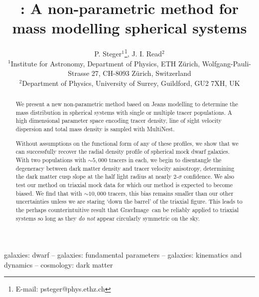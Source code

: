 \documentclass[useAMS,usenatbib,letter]{mn2e}
\title[\GravImage: Non-parametric spherical mass modelling]{\GravImage: A
  non-parametric method for mass modelling spherical systems}
\author[Steger]{P. Steger$^1$\thanks{E-mail: psteger@phys.ethz.ch}, J. I. Read$^{2}$\\
  $^1$Institute for Astronomy, Department of Physics, ETH Z\"urich, Wolfgang-Pauli-Strasse 27, CH-8093 Z\"urich, Switzerland\\
  $^2$Department of Physics, University of Surrey, Guildford, GU2 7XH, UK }
\def\GravImage{{\sc GravImage}}
\def\MultiNest{{\sc MultiNest}}
\begin{document}
\maketitle

\begin{abstract}
    We present a new non-parametric method based on Jeans modelling to
    determine the mass distribution in spherical systems with single
    or multiple tracer populations. A high dimensional parameter space
    encoding tracer density, line of sight velocity dispersion and
    total mass density is sampled with \MultiNest.

    Without assumptions on the functional form of any of these profiles, we show
    that we can successfully recover the radial density profile of spherical
    mock dwarf galaxies. With two populations with $\sim 5,000$ tracers in each,
    we begin to disentangle the degeneracy between dark matter density and
    tracer velocity anisotropy, determining the dark matter cusp slope at the
    half light radius at nearly 2-$\sigma$ confidence. We also test our method
    on triaxial mock data for which our method is expected to become biased. We
    find that with $\sim 10,000$ tracers, this bias remains smaller than our
    other uncertainties unless we are staring `down the barrel' of the triaxial
    figure. This leads to the perhaps counterintuitive result that \GravImage\
    can be reliably applied to triaxial systems so long as they {\it do not}
    appear circularly symmetric on the sky.
\end{abstract}

\begin{keywords} galaxies: dwarf -- galaxies: fundamental parameters
    -- galaxies: kinematics and dynamics -- cosmology: dark matter
\end{keywords}










\end{document}
